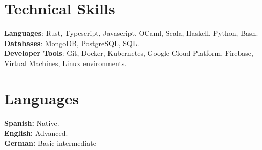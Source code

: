 \documentclass[letterpaper,11pt]{article}
\begin{document}
%
\section{Technical Skills}
 \begin{itemize}[leftmargin=0.15in, label={}]
    \small{\item{
     \textbf{Languages}{: Rust, Typescript, Javascript, OCaml, Scala, Haskell, Python, Bash.} \\
     \textbf{Databases}{: MongoDB, PostgreSQL, SQL.} \\
     \textbf{Developer Tools}{: Git, Docker, Kubernetes, Google Cloud Platform, Firebase, Virtual Machines, Linux environments.} \\
    }}
 \end{itemize}

\section{Languages}
 \begin{itemize}[leftmargin=0.15in, label={}]
    \small{\item{
     \textbf{Spanish: }{Native.} \\
     \textbf{English: }{Advanced.} \\
     \textbf{German: }{Basic intermediate} \\
    }}
 \end{itemize}


\end{document}
